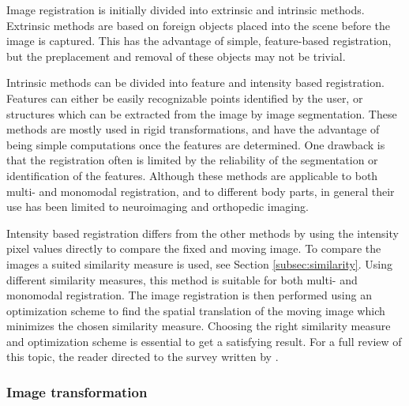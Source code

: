 Image registration is initially divided into extrinsic and intrinsic methods. Extrinsic methods are based on foreign objects placed into the scene before the image is captured. This has the advantage of simple, feature-based registration, but the preplacement and removal of these objects may not be trivial. 

Intrinsic methods can be divided into feature and intensity based registration. Features can either be easily recognizable points identified by the user, or structures which can be extracted from the image by image segmentation. These methods are mostly used in rigid transformations, and have the advantage of being simple computations once the features are determined. One drawback is that the registration often is limited by the reliability of the segmentation or identification of the features. Although these methods are applicable to both multi- and monomodal registration, and to different body parts, in general their use has been limited to neuroimaging and orthopedic imaging\cite{Maintz1998}.

Intensity based registration differs from the other methods by using the intensity pixel values directly to compare the fixed and moving image. To compare the images a suited similarity measure is used, see Section \ref{subsec:similarity}. Using different similarity measures, this method is suitable for both multi- and monomodal registration. The image registration is then performed using an optimization scheme to find the spatial translation of the moving image which minimizes the chosen similarity measure. Choosing the right similarity measure and optimization scheme is essential to get a satisfying result. For a full review of this topic, the reader directed to the survey written by \citet{Maintz1998}.

%

\subsubsection{Image transformation}

